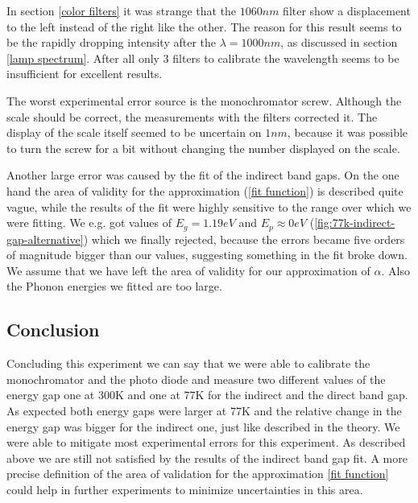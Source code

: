 \documentclass[]{article}
\begin{document}
In section \ref{color filters} it was strange that the $1060nm$ filter show a displacement to the left instead of the right like the other. The reason for this result seems to be the rapidly dropping intensity after the $\lambda =1000nm$, as discussed in section \ref{lamp spectrum}. After all only 3 filters to calibrate the wavelength seems to be insufficient for excellent results.

The worst experimental error source is the monochromator screw. Although the scale should be correct, the measurements with the filters corrected it. The display of the scale itself seemed to be uncertain on $1nm$, because it was possible to turn the screw for a bit without changing the number displayed on the scale. 

Another large error was caused by the fit of the indirect band gaps. On the one hand the area of validity for the approximation (\ref{fit function}) is described quite vague, while the results of the fit were highly sensitive to the range over which we were fitting. We e.g. got values of $E_g=1.19eV$ and $E_p\approx0eV$ (\ref{fig:77k-indirect-gap-alternative}) which we finally rejected, because the errors became five orders of magnitude bigger than our values, suggesting something in the fit broke down. We assume that we have left the area of validity for our approximation of $\alpha$. Also the Phonon energies we fitted are too large.

\subsection{Conclusion}
Concluding this experiment we can say that we were able to calibrate the monochromator and the photo diode and measure two different values of the energy gap one at 300K and one at 77K for the indirect and the direct band gap. As expected both energy gaps were larger at 77K and the relative change in the energy gap was bigger for the indirect one, just like described in the theory. We were able to mitigate most experimental errors for this experiment. As described above we are still not satisfied by the results of the indirect band gap fit. A more precise definition of the area of validation for the approximation \ref{fit function} could help in further experiments to minimize uncertainties in this area.

\newpage
\end{document}
